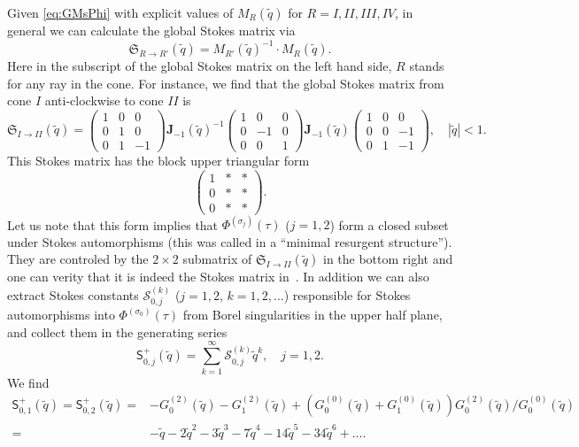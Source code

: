 \documentclass[12pt,reqno]{amsart}
\theoremstyle{definition}
\def\s{\sigma}
\def\tq{\tilde{q}}
\def\bJ{\mathbf J}
\def\mc{\mathcal}
\def\mf{\mathfrak}
\def\ms{\mathsf}
\newcommand{\nn}{\nonumber \\}
\begin{document}
Given \eqref{eq:GMsPhi} with explicit values of $M_R(\tq)$ for
$R=I,II,III,IV$, in general we can calculate the global Stokes matrix via
\begin{equation}
  \mf{S}_{R\rightarrow R'}(\tq) = M_{R'}(\tq)^{-1}\cdot M_{R}(\tq).
  \label{eq:SMM}
\end{equation}
Here in the subscript of the global Stokes matrix on the left hand
side, $R$ stands for any ray in the cone.
For instance, we find that the global Stokes matrix from cone $I$
anti-clockwise to cone $II$ is 
\begin{equation}
  \mf{S}_{I\rightarrow II}(\tq) =
  \begin{pmatrix}
    1&0&0\\
    0&1&0\\
    0&1&-1
  \end{pmatrix}
  \bJ_{-1}(\tq)^{-1}
  \begin{pmatrix}
    1&0&0\\
    0&-1&0\\
    0&0&1
  \end{pmatrix}
  \bJ_{-1}(\tq)
  \begin{pmatrix}
    1&0&0\\
    0&0&-1\\
    0&1&-1
  \end{pmatrix},\quad |\tq|<1.\label{eq:S12}
\end{equation}
This Stokes matrix has the block upper triangular form
\begin{equation}
    \begin{pmatrix}
    1&*&*\\
    0&*&*\\
    0&*&*
  \end{pmatrix}.\label{eq:1bd}
\end{equation}
Let us note that this form implies that
$\Phi^{(\s_j)}(\tau)$ ($j=1,2$) form a closed subset under Stokes
automorphisms (this was called in \cite{GM:top-sting} a ``minimal
resurgent structure'').  They are controled by the $2\times 2$
submatrix of $\mf{S}_{I\rightarrow II}(\tq)$ in the bottom right and
one can verity that it is indeed the Stokes matrix
in~\cite{GGM:resurgent}.  In addition we can also extract Stokes
constants $\mc{S}_{0,j}^{(k)}$ ($j=1,2$, $k=1,2,\ldots$) responsible
for Stokes automorphisms into $\Phi^{(\s_0)}(\tau)$ from Borel
singularities in the upper half plane, and collect them in the
generating series
\begin{equation}
  \ms{S}^+_{0,j}(\tq) = \sum_{k=1}^\infty
  \mc{S}_{0,j}^{(k)}\tq^k,\quad j=1,2.
\end{equation}
We find
\begin{align}
  \ms{S}_{0,1}^+(\tq) = \ms{S}_{0,2}^+(\tq) =
  &-G_0^{(2)}(\tq) - G_1^{(2)}(\tq)
    +  \left(G_0^{(0)}(\tq)+G_1^{(0)}(\tq)\right)G_0^{(2)}(\tq)
    /G_0^{(0)}(\tq)\nn=
  &-\tq-2\tq^2-3\tq^3-7\tq^4-14\tq^5-34\tq^6+\ldots.
\end{align}
\end{document}
